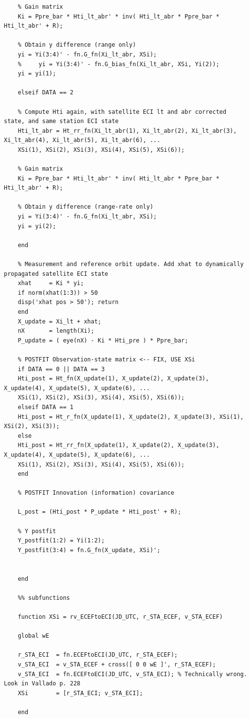 \documentclass[conf]{new-aiaa}
\begin{document}
\begin{lstlisting}
	% Gain matrix 
	Ki = Ppre_bar * Hti_lt_abr' * inv( Hti_lt_abr * Ppre_bar * Hti_lt_abr' + R); 
	
	% Obtain y difference (range only) 
	yi = Yi(3:4)' - fn.G_fn(Xi_lt_abr, XSi); 
	%     yi = Yi(3:4)' - fn.G_bias_fn(Xi_lt_abr, XSi, Yi(2)); 
	yi = yi(1); 
	
	elseif DATA == 2
	
	% Compute Hti again, with satellite ECI lt and abr corrected state, and same station ECI state 
	Hti_lt_abr = Ht_rr_fn(Xi_lt_abr(1), Xi_lt_abr(2), Xi_lt_abr(3), Xi_lt_abr(4), Xi_lt_abr(5), Xi_lt_abr(6), ... 
	XSi(1), XSi(2), XSi(3), XSi(4), XSi(5), XSi(6)); 
	
	% Gain matrix 
	Ki = Ppre_bar * Hti_lt_abr' * inv( Hti_lt_abr * Ppre_bar * Hti_lt_abr' + R); 
	
	% Obtain y difference (range-rate only) 
	yi = Yi(3:4)' - fn.G_fn(Xi_lt_abr, XSi); 
	yi = yi(2); 
	
	end
	
	% Measurement and reference orbit update. Add xhat to dynamically propagated satellite ECI state  
	xhat     = Ki * yi; 
	if norm(xhat(1:3)) > 50 
	disp('xhat pos > 50'); return 
	end
	X_update = Xi_lt + xhat; 
	nX       = length(Xi); 
	P_update = ( eye(nX) - Ki * Hti_pre ) * Ppre_bar; 
	
	% POSTFIT Observation-state matrix <-- FIX, USE XSi 
	if DATA == 0 || DATA == 3
	Hti_post = Ht_fn(X_update(1), X_update(2), X_update(3), X_update(4), X_update(5), X_update(6), ... 
	XSi(1), XSi(2), XSi(3), XSi(4), XSi(5), XSi(6)); 
	elseif DATA == 1
	Hti_post = Ht_r_fn(X_update(1), X_update(2), X_update(3), XSi(1), XSi(2), XSi(3)); 
	else
	Hti_post = Ht_rr_fn(X_update(1), X_update(2), X_update(3), X_update(4), X_update(5), X_update(6), ... 
	XSi(1), XSi(2), XSi(3), XSi(4), XSi(5), XSi(6));     
	end
	
	% POSTFIT Innovation (information) covariance 
	
	L_post = (Hti_post * P_update * Hti_post' + R); 
	
	% Y postfit 
	Y_postfit(1:2) = Yi(1:2); 
	Y_postfit(3:4) = fn.G_fn(X_update, XSi)'; 
	
	
	end 
	
	%% subfunctions 
	
	function XSi = rv_ECEFtoECI(JD_UTC, r_STA_ECEF, v_STA_ECEF)
	
	global wE 
	
	r_STA_ECI  = fn.ECEFtoECI(JD_UTC, r_STA_ECEF); 
	v_STA_ECI  = v_STA_ECEF + cross([ 0 0 wE ]', r_STA_ECEF); 
	v_STA_ECI  = fn.ECEFtoECI(JD_UTC, v_STA_ECI); % Technically wrong. Look in Vallado p. 228 
	XSi        = [r_STA_ECI; v_STA_ECI]; 
	
	end

\end{lstlisting}
\end{document}
